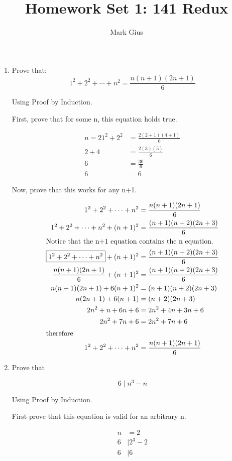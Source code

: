 \documentclass[11pt]{article}
\begin{document}
\author{Mark Gius}
\title{Homework Set 1: 141 Redux}
\maketitle

\begin{enumerate}

\item %

Prove that:
\[
1^2 + 2^2 + \cdots + n^2 = \frac{n(n+1)(2n+1)}{6}
\]

Using Proof by Induction.

First, prove that for some n, this equation holds true.

\begin{align*}
n = 2
1^2 + 2^2 & = \frac{2(2+1)(4+1)}{6} \\
2 + 4 & = \frac{2(3)(5)}{6} \\
6 &= \frac{30}{6} \\
6 &= 6
\end{align*}

Now, prove that this works for any n+1.

\begin{align*}
1^2 + 2^2 + \cdots + n^2 & = \frac{n(n+1)(2n+1)}{6} \\
1^2 + 2^2 + \cdots + n^2 + (n+1)^ 2 & = \frac{(n+1)(n+2)(2n+3)}{6} \\
\intertext{Notice that the n+1 equation contains the n equation.}
\boxed{1^2 + 2^2 + \cdots + n^2 } + (n+1)^ 2 & = \frac{(n+1)(n+2)(2n+3)}{6} \\
\frac{n(n+1)(2n+1)}{6} + (n+1)^2 & = \frac{(n+1)(n+2)(2n+3)}{6} \\
n(n+1)(2n+1) + 6(n+1)^2 & = (n+1)(n+2)(2n+3) \\
n(2n+1) + 6(n+1) & = (n+2)(2n+3) \\
2n^2 + n + 6n + 6 & = 2n^2 + 4n + 3n + 6 \\
2n^2 + 7n + 6 &= 2n^2 + 7n + 6 \\
\intertext{therefore}
1^2 + 2^2 + \cdots + n^2 & = \frac{n(n+1)(2n+1)}{6}
\end{align*}

\item %
Prove that

\[
6 \mid n^3 - n
\]

Using Proof by Induction.

First prove that this equation is valid for an arbitrary n.

\begin{align*}
n & = 2 \\
6 & \mid 2^3 - 2 \\
6 & \mid 6
\end{align*}


\end{enumerate}
\end{document}
